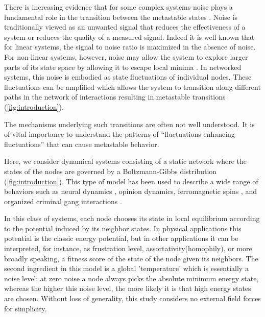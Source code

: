 \documentclass[a4paper, 11pt, twocolumn]{article}
\begin{document}
There is  increasing evidence that for  some complex systems
noise plays a fundamental role in the transition between the
metastable                                            states
\cite{Beggs2012,Mitchell1993,Mitchella,Forgoston2018a}.  Noise
is traditionally  viewed as an unwanted  signal that reduces
the effectiveness  of a system  or reduces the quality  of a
measured signal.  Indeed it  is well  known that  for linear
systems,  the signal  to  noise ratio  is  maximized in  the
absence of noise. For non-linear systems, however, noise may
allow the system to explore  larger parts of its state space
by     allowing     it     to    escape     local     minima
\cite{Czaplicka2013,Nicolis2016}.  In networked  systems, this
noise is embodied as state fluctuations of individual nodes.
These fluctuations can be  amplified which allows the system
to  transition  along  different  paths in  the  network  of
interactions    resulting    in    metastable    transitions
(\cref{fig:introduction}).

The  mechanisms underlying  such transitions  are often  not
well understood. It is of vital importance to understand the
patterns of  ``fluctuations enhancing fluctuations''  that can
cause metastable behavior.

Here, we  consider dynamical systems consisting  of a static
network  where the  states of  the nodes  are governed  by a
Boltzmann-Gibbs distribution (\cref{fig:introduction}). This
type of  model has  been used  to describe  a wide  range of
behaviors  such   as  neural   dynamics  \cite{Hopfield1982b},
opinion dynamics, ferromagnetic spins \cite{Glauber1963}, and
organized criminal gang interactions \cite{DOrsogna2015a}.

In this  class of  systems, each node  chooses its  state in
local equilibrium according to  the potential induced by its
neighbor states. In physical  applications this potential is
the classic  energy potential, but in  other applications it
can  be interpreted,  for  instance,  as frustration  level,
assortativity(homophily),  or   more  broadly   speaking,  a
fitness score of the state  of the node given its neighbors.
The   second  ingredient   in   this  model   is  a   global
'temperature' which  is essentially  a noise level;  at zero
noise a node always picks the absolute minimum energy state,
whereas the higher  this noise level, the more  likely it is
that  high  energy  states   are  chosen.  Without  loss  of
generality, this  study considers  no external  field forces
for simplicity.
\end{document}

